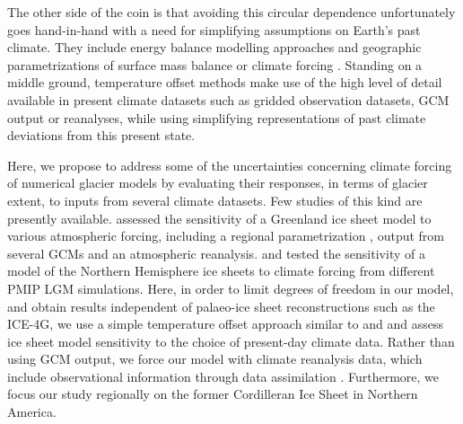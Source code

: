 The other side of the coin is that avoiding this circular dependence unfortunately goes hand-in-hand with a need for simplifying assumptions on Earth's past climate. They include energy balance modelling approaches \citep{tarasov-peltier-1997} and geographic parametrizations of surface mass balance \citep{robert-1991} or climate forcing \citep{johnson-fastook-2002}. Standing on a middle ground, temperature offset methods \citep{greve-etal-1999,bintanja-etal-2005} make use of the high level of detail available in present climate datasets such as gridded observation datasets, GCM output or reanalyses, while using simplifying representations of past climate deviations from this present state.

Here, we propose to address some of the uncertainties concerning climate forcing of numerical glacier models by evaluating their responses, in terms of glacier extent, to inputs from several climate datasets. Few studies of this kind are presently available. \citet{quiquet-etal-2012} assessed the sensitivity of a Greenland ice sheet model to various atmospheric forcing, including a regional parametrization \citep{fausto-etal-2009}, output from several GCMs and an atmospheric reanalysis. \citet{rodgers-etal-2004} and \citet{charbit-etal-2007} tested the sensitivity of a model of the Northern Hemisphere ice sheets to climate forcing from different PMIP LGM simulations. Here, in order to limit degrees of freedom in our model, and obtain results independent of palaeo-ice sheet reconstructions such as the ICE-4G, we use a simple temperature offset approach similar to \citet{greve-etal-1999} and \citet{bintanja-etal-2005} and assess ice sheet model sensitivity to the choice of present-day climate data. Rather than using GCM output, we force our model with climate reanalysis data, which include observational information through data assimilation \citep{bengtsson-etal-2007}. Furthermore, we focus our study regionally on the former Cordilleran Ice Sheet in Northern America.

